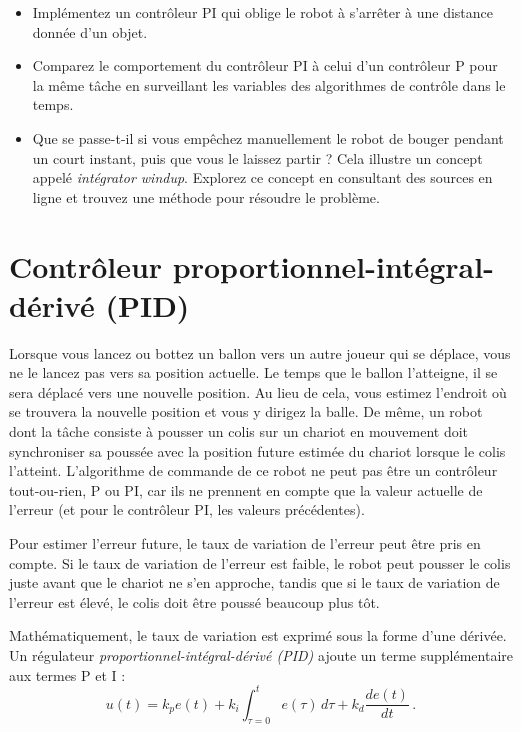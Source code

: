 \begin{framed}
\begin{itemize}
\item Implémentez un contrôleur PI qui oblige le robot à s'arrêter à une distance donnée d'un objet.
\item Comparez le comportement du contrôleur PI à celui d'un contrôleur P pour la même tâche en surveillant les variables des algorithmes de contrôle dans le temps.
\item Que se passe-t-il si vous empêchez manuellement le robot de bouger pendant un court instant, puis que vous le laissez partir ? Cela illustre un concept appelé \emph{intégrator windup}. Explorez ce concept en consultant des sources en ligne et trouvez une méthode pour résoudre le problème.
\end{itemize}
\end{framed}

\section{Contrôleur proportionnel-intégral-dérivé (PID)}\label{s.pid}

Lorsque vous lancez ou bottez un ballon vers un autre joueur qui se déplace, vous ne le lancez pas vers sa position actuelle. Le temps que le ballon l'atteigne, il se sera déplacé vers une nouvelle position. Au lieu de cela, vous estimez l'endroit où se trouvera la nouvelle position et vous y dirigez la balle. De même, un robot dont la tâche consiste à pousser un colis sur un chariot en mouvement doit synchroniser sa poussée avec la position future estimée du chariot lorsque le colis l'atteint. L'algorithme de commande de ce robot ne peut pas être un contrôleur tout-ou-rien, P ou PI, car ils ne prennent en compte que la valeur actuelle de l'erreur (et pour le contrôleur PI, les valeurs précédentes). 

Pour estimer l'erreur future, le taux de variation de l'erreur peut être pris en compte. Si le taux de variation de l'erreur est faible, le robot peut pousser le colis juste avant que le chariot ne s'en approche, tandis que si le taux de variation de l'erreur est élevé, le colis doit être poussé beaucoup plus tôt.

Mathématiquement, le taux de variation est exprimé sous la forme d'une dérivée. Un régulateur \emph{proportionnel-intégral-dérivé (PID)} ajoute un terme supplémentaire aux termes P et I :
\begin{equation}
u(t) = k_pe(t) + k_i\int_{\tau=0}^t e(\tau)\,d\tau + k_d \frac{de(t)}{dt}\,.\label{eq.pid}
\end{equation}

